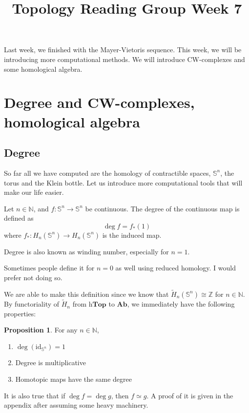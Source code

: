 \documentclass[12pt,reqno]{amsart}
\numberwithin{theorem}{section}
\theoremstyle{definition}
\theoremstyle{remark}
\numberwithin{equation}{section}
\newcommand{\Z}{\mathbb Z}
\newcommand{\N}{\mathbb N}
\renewcommand{\S}{\mathbb S}
\theoremstyle{definition}
\newtheorem{prop}[theorem]{Proposition}
\newcommand{\id}{\mathrm{id}}
\begin{document}
\title{Topology Reading Group Week 7}
\maketitle
Last week, we finished with the Mayer-Vietoris sequence. This week, we will be introducing more computational methods. We will introduce CW-complexes and some homological algebra.
\section{Degree and CW-complexes, homological algebra}
\subsection{Degree}
So far all we have computed are the homology of contractible spaces, $\S^n$, the torus and the Klein bottle. Let us introduce more computational tools that will make our life easier.
\begin{definition}
    Let $n \in \N$, and $f:\S^n \rightarrow \S^n$ be continuous. The degree of the continuous map is defined as
    $$\deg f = f_*(1)$$
    where $f_* : H_n(\S^n)\rightarrow  H_n(\S^n)$ is the induced map.
\end{definition}
\begin{remark}
    Degree is also known as winding number, especially for $n = 1$.
\end{remark}
\begin{remark}
    Sometimes people define it for $n=0$ as well using reduced homology. I would prefer not doing so.
\end{remark}
We are able to make this definition since we know that $\tilde H_n(\S^n) \cong \Z$ for $n \in \N$. By functoriality of $\tilde H_n$ from $\mathrm{h}\mathbf{Top}$ to $\mathbf{Ab}$, we immediately have the following properties:
\begin{prop}
For any $n \in \N$,
    \begin{enumerate} 
        \item $\deg (\id_{\S^n}) = 1$
        \item Degree is multiplicative
        \item Homotopic maps have the same degree
    \end{enumerate}
\end{prop}
\begin{remark}
    It is also true that if $\deg f = \deg g$, then $f \simeq g$. A proof of it is given in the appendix after assuming some heavy machinery. 
\end{remark}
\end{document}
